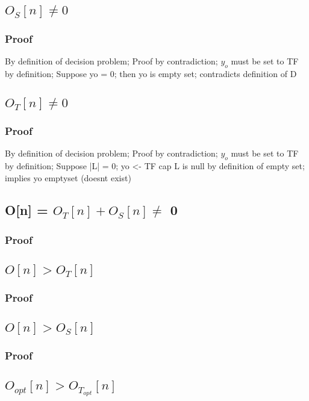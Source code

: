 \documentclass[11pt]{article}
\begin{document}
\subsection{$O_S[n] \neq 0$}
\subsubsection{Proof}
By definition of decision problem; Proof by contradiction; $y_o$ must be set to TF by definition; Suppose yo = 0; then yo is empty set; contradicts definition of D

\subsection{$O_T[n] \neq 0$}
\subsubsection{Proof}
By definition of decision problem; Proof by contradiction; $y_o$ must be set to TF by definition; Suppose |L| = 0; yo <- TF cap L is null by definition of empty set; implies yo emptyset (doesnt exist)

\subsection{O[n] = $O_T[n] + O_S[n] \neq$ 0}
\subsubsection{Proof}

\subsection{$O[n] > O_T[n]$}
\subsubsection{Proof}

\subsection{$O[n] > O_S[n]$}
\subsubsection{Proof}

\subsection{$O_{opt}[n] > O_{T_{opt}}[n]$}
\end{document}
